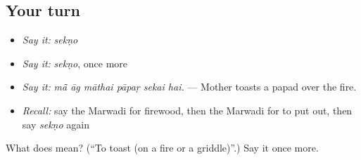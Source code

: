 \subsection*{Your turn}
\begin{itemize}
\raggedright
  \item \emph{Say it:} \emph{sekṇo}
  \item \emph{Say it:} \emph{sekṇo}, once more
  \item \emph{Say it:} \emph{mā̃ āg māthai pāpaṛ sekai hai.} — Mother toasts a papad over the fire.
  \item \emph{Recall:} say the Marwadi for firewood, then the Marwadi for to put out, then say \emph{sekṇo} again
\end{itemize}

\begin{tcolorbox}[breakable,colback=teal!4,colframe=teal!35!black,title={Before you move on}]
What does  mean? (\textquotedblleft{}To toast (on a fire or a griddle)\textquotedblright{}.) Say it once more.
\end{tcolorbox}
